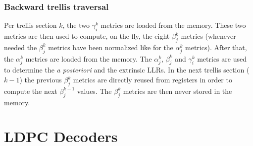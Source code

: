 \subsubsection{Backward trellis traversal}

Per trellis section $k$, the two $\gamma_i^k$ metrics are loaded from the
memory. These two metrics are then used to compute, on the fly, the eight
$\beta_j^k$ metrics (whenever needed the $\beta_j^k$ metrics have been
normalized like for the $\alpha_j^k$ metrics). After that, the $\alpha_j^k$
metrics are loaded from the memory. The $\alpha_j^k$, $\beta_j^k$ and
$\gamma_i^k$ metrics are used to determine the \textit{a posteriori} and the
extrinsic LLRs. In the next trellis section ($k-1$) the previous $\beta_j^k$
metrics are directly reused from registers in order to compute the next
$\beta_j^{k-1}$ values. The $\beta_j^k$ metrics are then never stored in the
memory.

\section{LDPC Decoders}


